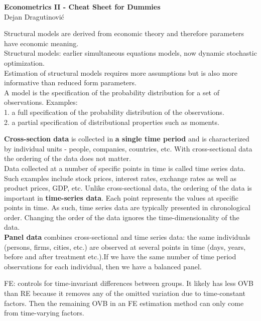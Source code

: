 \documentclass[7pt, a4paper]{article}
\begin{document}
\begin{center}
\textbf{{\LARGE Econometrics II - Cheat Sheet for Dummies}}\\
Dejan Dragutinovi\'{c}\\
\end{center}

\begin{multicols*}{3}
Structural models are derived from economic theory and therefore
parameters have economic meaning.\\
Structural models: earlier simultaneous equations models, now dynamic stochastic optimization.\\
Estimation of structural models requires more assumptions but is also
more informative than reduced form parameters.\\
A model is the specification of the probability distribution for a set of
observations. Examples:\\
1. a full specification of the probability distribution of the observations.\\
2. a partial specification of distributional properties such as moments.

\textbf{Cross-section data} is collected in \textbf{a single time period} and is characterized by individual units - people, companies, countries, etc. With cross-sectional data the ordering of the data does not matter.\\
Data collected at a number of specific points in time is called time series data. Such examples include stock prices, interest rates, exchange rates as well as product prices, GDP, etc. Unlike cross-sectional data, the ordering of the data is important in \textbf{time-series data}. Each point represents the values at specific points in time. As such, time series data are typically presented in chronological order. Changing the order of the data ignores the time-dimensionality of the data.\\
\textbf{Panel data} combines cross-sectional and time series data: the same individuals (persons, firms, cities, etc.) are observed at several points in time (days, years, before and after treatment etc.).If we have the same number of time period observations for each individual, then we have a balanced panel.

FE: controls for time-invariant differences between groups. It likely has less OVB than RE because it removes any of the omitted variation due to time-constant factors. Then the remaining OVB in an FE estimation method can only come from time-varying factors.


\end{multicols*}
\end{document}
